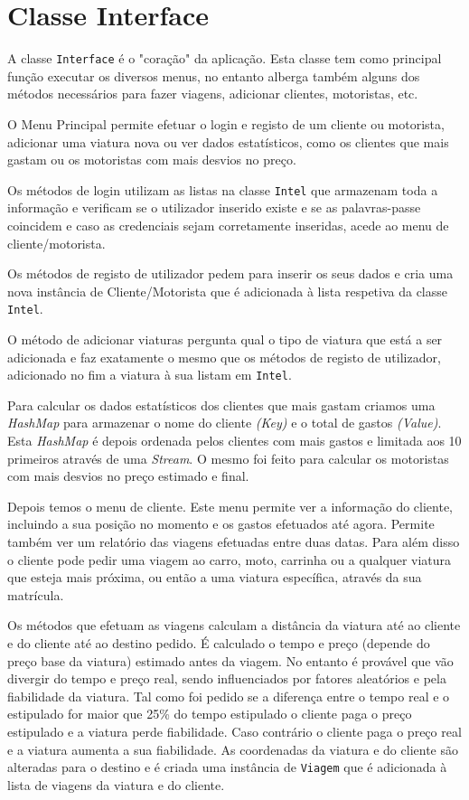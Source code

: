 \documentclass[a4paper,12pt]{report}
\begin{document}
\section{Classe Interface}

A classe {\tt Interface} é o "coração" da aplicação. Esta classe tem como principal função executar os diversos menus, no entanto alberga também alguns dos métodos necessários para fazer viagens, adicionar clientes, motoristas, etc.

O Menu Principal permite efetuar o login e registo de um cliente ou motorista, adicionar uma viatura nova ou ver dados estatísticos, como os clientes que mais gastam ou os motoristas com mais desvios no preço.

Os métodos de login utilizam as listas na classe {\tt Intel} que armazenam toda a informação e verificam se o utilizador inserido existe e se as palavras-passe coincidem e caso as credenciais sejam corretamente inseridas, acede ao menu de cliente/motorista.

Os métodos de registo de utilizador pedem para inserir os seus dados e cria uma nova instância de Cliente/Motorista que é adicionada à lista respetiva da classe {\tt Intel}.

O método de adicionar viaturas pergunta qual o tipo de viatura que está a ser adicionada e faz exatamente o mesmo que os métodos de registo de utilizador, adicionado no fim a viatura à sua listam em {\tt Intel}.

Para calcular os dados estatísticos dos clientes que mais gastam criamos uma {\sl HashMap} para armazenar o nome do cliente {\sl (Key)} e o total de gastos {\sl (Value)}. Esta {\sl HashMap} é depois ordenada pelos clientes com mais gastos e limitada aos 10 primeiros através de uma {\sl Stream}. O mesmo foi feito para calcular os motoristas com mais desvios no preço estimado e final.

Depois temos o menu de cliente. Este menu permite ver a informação do cliente, incluindo a sua posição no momento e os gastos efetuados até agora. Permite também ver um relatório das viagens efetuadas entre duas datas. Para além disso o cliente pode pedir uma viagem ao carro, moto, carrinha ou a qualquer viatura que esteja mais próxima, ou então a uma viatura específica, através da sua matrícula.

Os métodos que efetuam as viagens calculam a distância da viatura até ao cliente e do cliente até ao destino pedido. É calculado o tempo e preço (depende do preço base da viatura) estimado antes da viagem. No entanto é provável que vão divergir do tempo e preço real, sendo influenciados por fatores aleatórios e pela fiabilidade da viatura. Tal como foi pedido se a diferença entre o tempo real e o estipulado for maior que 25\% do tempo estipulado o cliente paga o preço estipulado e a viatura perde fiabilidade. Caso contrário o cliente paga o preço real e a viatura aumenta a sua fiabilidade. As coordenadas da viatura e do cliente são alteradas para o destino e é criada uma instância de {\tt Viagem} que é adicionada à lista de viagens da viatura e do cliente.
\end{document}
